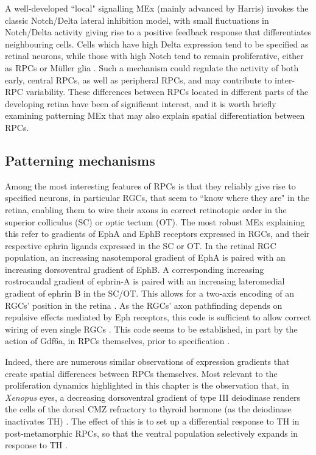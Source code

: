 A well-developed ``local" signalling MEx (mainly advanced by Harris) invokes the classic Notch/Delta lateral inhibition model, with small fluctuations in Notch/Delta activity giving rise to a positive feedback response that differentiates neighbouring cells. Cells which have high Delta expression tend to be specified as retinal neurons, while those with high Notch tend to remain proliferative, either as RPCs or M{\"u}ller glia \cite{Dorsky1995,Dorsky1997}. Such a mechanism could regulate the activity of both early, central RPCs, as well as peripheral RPCs, and may contribute to inter-RPC variability. These differences between RPCs located in different parts of the developing retina have been of significant interest, and it is worth briefly examining patterning MEx that may also explain spatial differentiation between RPCs.
\subsection{Patterning mechanisms}

Among the most interesting features of RPCs is that they reliably give rise to specified neurons, in particular RGCs, that seem to ``know where they are" in the retina, enabling them to wire their axons in correct retinotopic order in the superior colliculus (SC) or optic tectum (OT). The most robust MEx explaining this refer to gradients of EphA and EphB receptors expressed in RGCs, and their respective ephrin ligands expressed in the SC or OT. In the retinal RGC population, an increasing nasotemporal gradient of EphA is paired with an increasing dorsoventral gradient of EphB. A corresponding increasing rostrocaudal gradient of ephrin-A is paired with an increasing lateromedial gradient of ephrin B in the SC/OT. 
This allows for a two-axis encoding of an RGCs' position in the retina \cite{Tsigankov2006}. As the RGCs' axon pathfinding depends on repulsive effects mediated by Eph receptors, this code is sufficient to allow correct wiring of even single RGCs \cite{Gosse2008}. This code seems to be established, in part by the action of Gdf6a, in RPCs themselves, prior to specification \cite{French2009}.

Indeed, there are numerous similar observations of expression gradients that create spatial differences between RPCs themselves. Most relevant to the proliferation dynamics highlighted in this chapter is the observation that, in \textit{Xenopus} eyes, a decreasing dorsoventral gradient of type III deiodinase renders the cells of the dorsal CMZ refractory to thyroid hormone (as the deiodinase inactivates TH) \cite{Marsh-Armstrong1999}. The effect of this is to set up a differential response to TH in post-metamorphic RPCs, so that the ventral population selectively expands in response to TH \cite{Beach1979}. 

